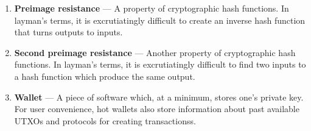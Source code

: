 \documentclass[full.tex]{subfiles}
\begin{document}
\begin{enumerate}
        \item \textbf{Preimage resistance} --- A property of cryptographic hash functions. In layman's terms, it is excrutiatingly difficult to create an inverse hash function that turns outputs to inputs.
        \item \textbf{Second preimage resistance} --- Another property of cryptographic hash functions. In layman's terms, it is excrutiatingly difficult to find two inputs to a hash function which produce the same output.
        \item \textbf{Wallet} --- A piece of software which, at a minimum, stores one's private key. For user convenience, hot wallets also store information about past available UTXOs and protocols for creating transactionss.
    \end{enumerate}
\end{document}
